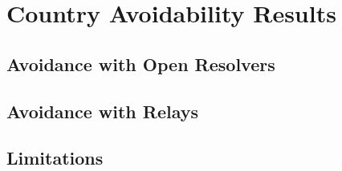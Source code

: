 \section{Country Avoidability Results}
\label{avoid_results}

\subsection{Avoidance with Open Resolvers}

\subsection{Avoidance with Relays}

\subsection{Limitations}

